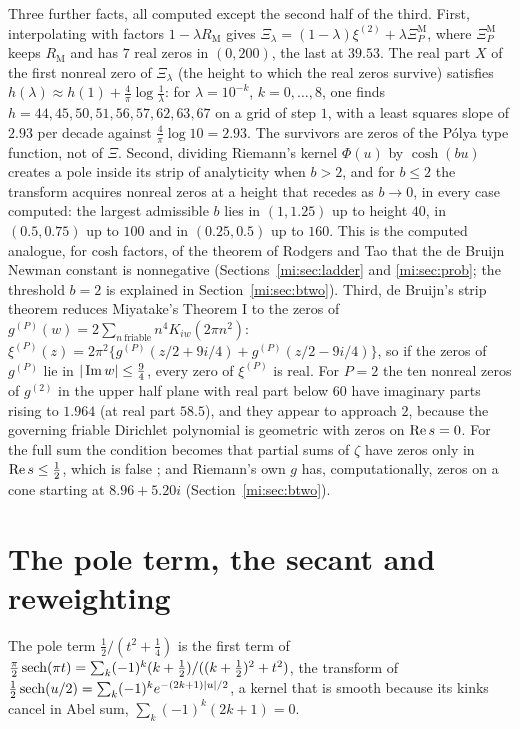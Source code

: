 Three further facts, all computed except the second half of the third. First, interpolating with factors $1-\lambda R_{\mathrm M}$ gives $\Xi_\lambda=(1-\lambda)\xi^{(2)}+\lambda\Xi_P^{\mathrm M}$, where $\Xi_P^{\mathrm M}$ keeps $R_{\mathrm M}$ and has $7$ real zeros in $(0,200)$, the last at $39.53$. The real part $X$ of the first nonreal zero of $\Xi_\lambda$ (the height to which the real zeros survive) satisfies $h(\lambda)\approx h(1)+\frac4\pi\log\frac1\lambda$: for $\lambda=10^{-k}$, $k=0,\dots,8$, one finds $h=44,45,50,51,56,57,62,63,67$ on a grid of step $1$, with a least squares slope of $2.93$ per decade against $\frac4\pi\log10=2.93$. The survivors are zeros of the P\'olya type function, not of $\Xi$. Second, dividing Riemann's kernel $\Phi(u)$ by $\cosh(bu)$ creates a pole inside its strip of analyticity when $b>2$, and for $b\le2$ the transform acquires nonreal zeros at a height that recedes as $b\to0$, in every case computed: the largest admissible $b$ lies in $(1,1.25)$ up to height $40$, in $(0.5,0.75)$ up to $100$ and in $(0.25,0.5)$ up to $160$. This is the computed analogue, for cosh factors, of the theorem of Rodgers and Tao \cite{RodgersTao} that the de Bruijn Newman constant is nonnegative (Sections~\ref{mi:sec:ladder} and \ref{mi:sec:prob}; the threshold $b=2$ is explained in Section~\ref{mi:sec:btwo}). Third, de Bruijn's strip theorem \cite{deBruijn} reduces Miyatake's Theorem I to the zeros of $g^{(P)}(w)=2\sum_{n\ \text{friable}}n^4K_{iw}(2\pi n^2)$: $\xi^{(P)}(z)=2\pi^2\{g^{(P)}(z/2+9i/4)+g^{(P)}(z/2-9i/4)\}$, so if the zeros of $g^{(P)}$ lie in $|\operatorname{Im} w|\le\frac94$, every zero of $\xi^{(P)}$ is real. For $P=2$ the ten nonreal zeros of $g^{(2)}$ in the upper half plane with real part below $60$ have imaginary parts rising to $1.964$ (at real part $58.5$), and they appear to approach $2$, because the governing friable Dirichlet polynomial is geometric with zeros on $\operatorname{Re} s=0$. For the full sum the condition becomes that partial sums of $\zeta$ have zeros only in $\operatorname{Re} s\le\frac12$, which is false \cite{Montgomery83}; and Riemann's own $g$ has, computationally, zeros on a cone starting at $8.96+5.20i$ (Section~\ref{mi:sec:btwo}).

\section{The pole term, the secant and reweighting}\label{mi:sec:sech}

The pole term $\tfrac12/(t^2+\tfrac14)$ is the first term of $\frac\pi2\operatorname{sech}(\pi t)=\sum_k(-1)^k(k+\frac12)/((k+\frac12)^2+t^2)$, the transform of $\tfrac12\operatorname{sech}(u/2)=\sum_k(-1)^ke^{-(2k+1)|u|/2}$, a kernel that is smooth because its kinks cancel in Abel sum, $\sum_k(-1)^k(2k+1)=0$.

